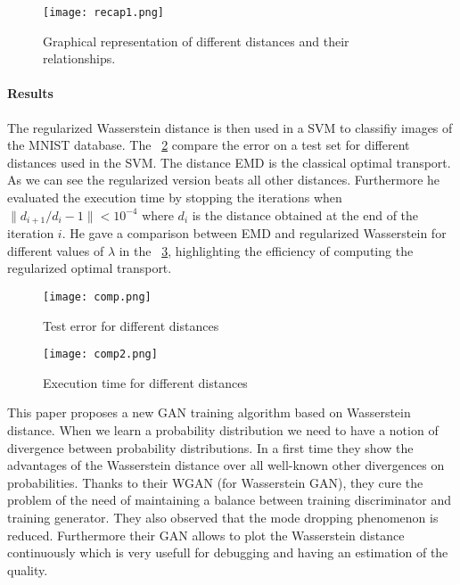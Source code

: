 \begin{figure}
	\centering
	\texttt{[image: recap1.png]}
	\captionsetup{justification=centering}
	\caption{Graphical representation of different distances and their relationships.}
	\label{recap1}
\end{figure}

\paragraph{Results}
The regularized Wasserstein distance is then used in a SVM to classifiy
images of the MNIST database. The \figurename~\ref{comp} compare the error
on a test set for different distances used in the SVM. The distance EMD
is the classical optimal transport. As we can see the regularized version
beats all other distances. Furthermore he evaluated the execution time by
stopping the iterations when $\| d_{i+1} / d_i - 1 \| < 10^{-4}$ where $d_i$
is the distance obtained at the end of the iteration $i$. He gave a comparison
between EMD and regularized Wasserstein for different values of $\lambda$
in the \figurename~\ref{comp2}, highlighting the efficiency of computing
the regularized optimal transport.

\begin{figure}[h]
	\centering
	\texttt{[image: comp.png]}
	\caption{Test error for different distances}
	\label{comp}
\end{figure}
\begin{figure}[h]
\centering
\texttt{[image: comp2.png]}
\caption{Execution time for different distances}
\label{comp2}
\end{figure}

\newpage


This paper proposes a new GAN training algorithm based on Wasserstein
distance. When we learn a probability distribution we need to have a notion of
divergence between probability distributions. In a first time they show the
advantages of the Wasserstein distance over all well-known other divergences
on probabilities. Thanks to their WGAN (for Wasserstein GAN), they cure the
problem of the need of maintaining a balance between training discriminator
and training generator. They also observed that the mode dropping phenomenon
is reduced. Furthermore their GAN allows to plot the Wasserstein distance
continuously which is very usefull for debugging and having an estimation
of the quality.

